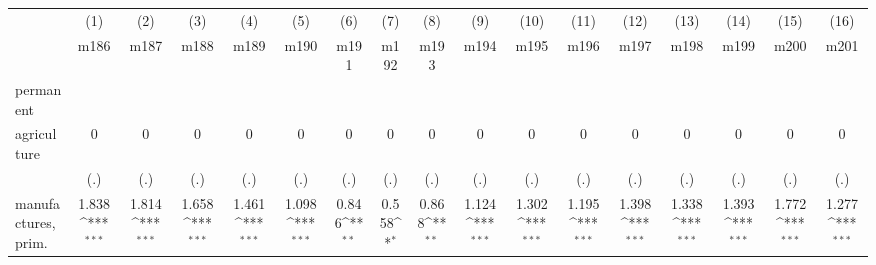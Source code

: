 {
\def\sym#1{\ifmmode^{#1}\else\(^{#1}\)\fi}
\begin{tabular}{l*{16}{c}}
\hline\hline
                    &\multicolumn{1}{c}{(1)}&\multicolumn{1}{c}{(2)}&\multicolumn{1}{c}{(3)}&\multicolumn{1}{c}{(4)}&\multicolumn{1}{c}{(5)}&\multicolumn{1}{c}{(6)}&\multicolumn{1}{c}{(7)}&\multicolumn{1}{c}{(8)}&\multicolumn{1}{c}{(9)}&\multicolumn{1}{c}{(10)}&\multicolumn{1}{c}{(11)}&\multicolumn{1}{c}{(12)}&\multicolumn{1}{c}{(13)}&\multicolumn{1}{c}{(14)}&\multicolumn{1}{c}{(15)}&\multicolumn{1}{c}{(16)}\\
                    &\multicolumn{1}{c}{m186}&\multicolumn{1}{c}{m187}&\multicolumn{1}{c}{m188}&\multicolumn{1}{c}{m189}&\multicolumn{1}{c}{m190}&\multicolumn{1}{c}{m191}&\multicolumn{1}{c}{m192}&\multicolumn{1}{c}{m193}&\multicolumn{1}{c}{m194}&\multicolumn{1}{c}{m195}&\multicolumn{1}{c}{m196}&\multicolumn{1}{c}{m197}&\multicolumn{1}{c}{m198}&\multicolumn{1}{c}{m199}&\multicolumn{1}{c}{m200}&\multicolumn{1}{c}{m201}\\
\hline
permanent           &                     &                     &                     &                     &                     &                     &                     &                     &                     &                     &                     &                     &                     &                     &                     &                     \\
agriculture         &           0         &           0         &           0         &           0         &           0         &           0         &           0         &           0         &           0         &           0         &           0         &           0         &           0         &           0         &           0         &           0         \\
                    &         (.)         &         (.)         &         (.)         &         (.)         &         (.)         &         (.)         &         (.)         &         (.)         &         (.)         &         (.)         &         (.)         &         (.)         &         (.)         &         (.)         &         (.)         &         (.)         \\
[1em]
manufactures, prim. &       1.838\sym{***}&       1.814\sym{***}&       1.658\sym{***}&       1.461\sym{***}&       1.098\sym{***}&       0.846\sym{**} &       0.558\sym{*}  &       0.868\sym{**} &       1.124\sym{***}&       1.302\sym{***}&       1.195\sym{***}&       1.398\sym{***}&       1.338\sym{***}&       1.393\sym{***}&       1.772\sym{***}&       1.277\sym{***}\\

\end{tabular}}
